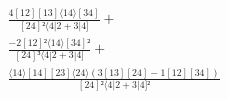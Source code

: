\documentclass[varwidth, border=5pt]{standalone}
\begin{document}
\begin{my}
$\begin{gathered}
\scriptscriptstyle\frac{4[12][13]⟨14⟩[34]}{[24]²⟨4|2+3|4]} +\\
\scriptscriptstyle\frac{-2[12]²⟨14⟩[34]²}{[24]³⟨4|2+3|4]} +\\
\scriptscriptstyle\frac{⟨14⟩[14][23]⟨24⟩(3[13][24]-1[12][34])}{[24]²⟨4|2+3|4]²} \phantom{+}
\end{gathered}$
\end{my}
\end{document}
